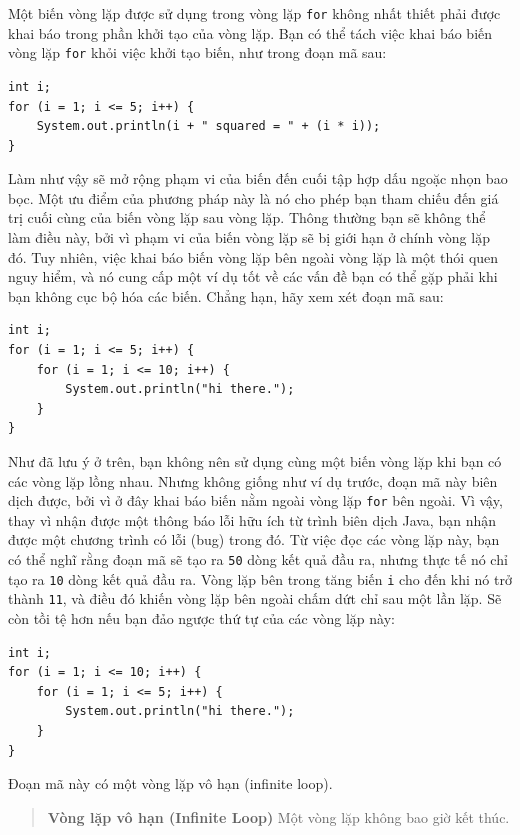 Một biến vòng lặp được sử dụng trong vòng lặp \texttt{for} không nhất
thiết phải được khai báo trong phần khởi tạo của vòng lặp. Bạn có thể
tách việc khai báo biến vòng lặp \texttt{for} khỏi việc khởi tạo biến,
như trong đoạn mã sau:

\begin{verbatim}
int i;
for (i = 1; i <= 5; i++) {
    System.out.println(i + " squared = " + (i * i));
}
\end{verbatim}

Làm như vậy sẽ mở rộng phạm vi của biến đến cuối tập hợp dấu ngoặc nhọn
bao bọc. Một ưu điểm của phương pháp này là nó cho phép bạn tham chiếu
đến giá trị cuối cùng của biến vòng lặp sau vòng lặp. Thông thường bạn
sẽ không thể làm điều này, bởi vì phạm vi của biến vòng lặp sẽ bị giới
hạn ở chính vòng lặp đó. Tuy nhiên, việc khai báo biến vòng lặp bên
ngoài vòng lặp là một thói quen nguy hiểm, và nó cung cấp một ví dụ tốt
về các vấn đề bạn có thể gặp phải khi bạn không cục bộ hóa các biến.
Chẳng hạn, hãy xem xét đoạn mã sau:

\begin{verbatim}
int i;
for (i = 1; i <= 5; i++) {
    for (i = 1; i <= 10; i++) {
        System.out.println("hi there.");
    }
}
\end{verbatim}

Như đã lưu ý ở trên, bạn không nên sử dụng cùng một biến vòng lặp khi
bạn có các vòng lặp lồng nhau. Nhưng không giống như ví dụ trước, đoạn
mã này biên dịch được, bởi vì ở đây khai báo biến nằm ngoài vòng lặp
\texttt{for} bên ngoài. Vì vậy, thay vì nhận được một thông báo lỗi hữu
ích từ trình biên dịch Java, bạn nhận được một chương trình có lỗi (bug)
trong đó. Từ việc đọc các vòng lặp này, bạn có thể nghĩ rằng đoạn mã sẽ
tạo ra \texttt{50} dòng kết quả đầu ra, nhưng thực tế nó chỉ tạo ra
\texttt{10} dòng kết quả đầu ra. Vòng lặp bên trong tăng biến \texttt{i}
cho đến khi nó trở thành \texttt{11}, và điều đó khiến vòng lặp bên
ngoài chấm dứt chỉ sau một lần lặp. Sẽ còn tồi tệ hơn nếu bạn đảo ngược
thứ tự của các vòng lặp này:

\begin{verbatim}
int i;
for (i = 1; i <= 10; i++) {
    for (i = 1; i <= 5; i++) {
        System.out.println("hi there.");
    }
}
\end{verbatim}

Đoạn mã này có một vòng lặp vô hạn (infinite loop).

\begin{quote}
\textbf{Vòng lặp vô hạn (Infinite Loop)} Một vòng lặp không bao giờ kết
thúc.
\end{quote}

